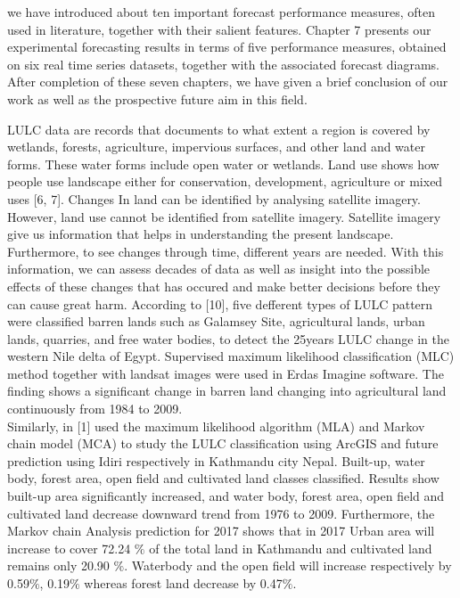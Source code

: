 \documentclass[12pt,a4paper]{article}
\begin{document}
	we have introduced about ten important forecast performance measures, often used in literature, together with their salient features. Chapter 7 presents our experimental forecasting results in terms of five performance measures, obtained on six real time series datasets, together with the associated forecast diagrams. After completion of these seven chapters, we have given a brief conclusion of our work as well as the prospective future aim in this field. 
	
	\newpage
	LULC data are records that documents to what extent a region is covered by wetlands, forests, agriculture, impervious surfaces, and 	other land and water forms. These water forms include open water  or wetlands. Land use shows how people use landscape either for conservation, development, agriculture or mixed uses [6, 7]. Changes In land can be identified by analysing satellite imagery. However, land use cannot be identified from satellite imagery. Satellite imagery give us  information that helps in understanding the present landscape. Furthermore, to see changes	through time, different years are needed. With this information, we can assess  decades of data as well as  insight into the possible effects of these changes that has occured and make better decisions before they can cause great harm.	According to [10], five defferent types of LULC pattern were classified barren lands such as Galamsey Site, agricultural lands, urban lands, quarries, and free water bodies, to detect the 25years LULC change in the western Nile delta of Egypt. Supervised maximum likelihood classification (MLC)	method together with landsat images were used in Erdas Imagine software. The finding shows a significant
	change in barren land changing into agricultural land continuously	from 1984 to 2009.\\
	
	Similarly, in [1] used the maximum likelihood algorithm (MLA)	and Markov chain model (MCA) to study the LULC classification	using ArcGIS and future prediction using Idiri respectively in	Kathmandu city Nepal. Built-up, water body, forest area, open	field and cultivated land classes classified. Results show built-up	area significantly increased, and water body, forest area, open	field and cultivated land decrease downward trend from 1976 to
	2009. Furthermore, the Markov chain Analysis prediction for 2017	shows that in 2017 Urban area will increase to cover 72.24 $\%$ of	the total land in Kathmandu and cultivated land remains only	20.90 $\%$. Waterbody and the open field will increase respectively	by 0.59$\%$, 0.19$\%$ whereas forest land decrease by 0.47$\%$.\\
	
\end{document}
